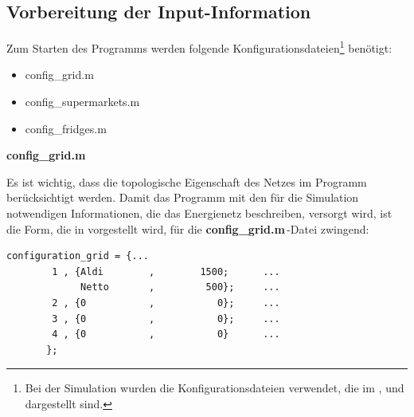 \subsection*{Vorbereitung der Input-Information}
\label{sec:input_infos}

Zum Starten des Programms werden folgende Konfigurationsdateien\footnote{ Bei
der Simulation wurden die Konfigurationsdateien verwendet, die im
,  und 
dargestellt sind.} benötigt:

\begin{itemize}
	\item config\_grid.m
	\item config\_supermarkets.m
	\item config\_fridges.m
\end{itemize}
\vspace{3mm}
\noindent\textbf{config\_grid.m}
\vspace{3mm}

Es ist wichtig, dass die topologische Eigenschaft des Netzes im Programm
berücksichtigt werden. Damit das Programm mit den für die Simulation notwendigen
Informationen, die das Energienetz beschreiben, versorgt wird, ist die Form, die
in  vorgestellt wird, für die \textbf{config\_grid.m$\,$}-Datei
zwingend:

\begin{lstlisting}[float=h,caption={config\_grid.m},label={cgrid}]
%%	Bus,  Supermarkets,	  Number of Supermarkets
configuration_grid = {...
        1 , {Aldi	     ,	      1500;	     ...
             Netto	     ,	       500};	 ...
        2 , {0	         ,           0};	 ...
        3 , {0	         ,           0};	 ...
        4 , {0	         ,           0}	     ...
       };
\end{lstlisting}

